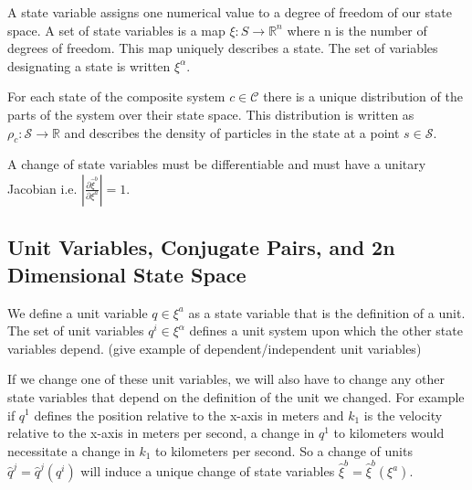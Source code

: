 \documentclass{article}
\begin{document}

\begin{defn}
	A state variable assigns one numerical value to a degree of freedom of our state space. A set of state variables is a map $\xi : S \rightarrow \mathbb{R}^n $ where n is the number of degrees of freedom. This map uniquely describes a state. The set of variables designating a state is written $\xi^\alpha$.
\end{defn}

\begin{defn}
	For each state of the composite system $c \in \mathcal{C}$ there is a unique distribution of the parts of the system over their state space. This distribution is written as $\rho_c: \mathcal{S} \rightarrow \mathbb{R}$ and describes the density of particles in the state at a point $s \in \mathcal{S}$.
\end{defn}

\begin{prop}
	A change of state variables must be differentiable and must have a unitary Jacobian i.e. $\left|\frac{\partial\hat{\xi}^b}{\partial\xi^a}\right| = 1$.
\end{prop}


\subsection{Unit Variables, Conjugate Pairs, and 2n Dimensional State Space}

\begin{defn}
	We define a unit variable $q \in \xi^a$ as a state variable that is the definition of a unit. The set of unit variables $q^i \in \xi^\alpha$ defines a unit system upon which the other state variables depend. (give example of dependent/independent unit variables)
\end{defn}

	If we change one of these unit variables, we will also have to change any other state variables that depend on the definition of the unit we changed. For example if $q^1$ defines the position relative to the x-axis in meters and $k_1$ is the velocity relative to the x-axis in meters per second, a change in $q^1$ to kilometers would necessitate a change in $k_1$ to kilometers per second. So a change of units $\hat{q}^j = \hat{q}^j(q^i)$ will induce a unique change of state variables $\hat{\xi}^b = \hat{\xi}^b(\xi^a)$.
\end{document}
